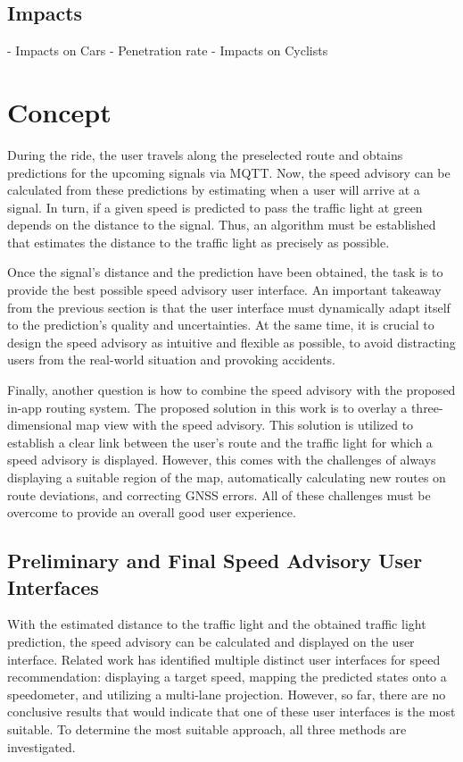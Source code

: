 \subsection{Impacts}

- Impacts on Cars
- Penetration rate
- Impacts on Cyclists

\section{Concept}

During the ride, the user travels along the preselected route and obtains predictions for the upcoming signals via MQTT. Now, the speed advisory can be calculated from these predictions by estimating when a user will arrive at a signal. In turn, if a given speed is predicted to pass the traffic light at green depends on the distance to the signal. Thus, an algorithm must be established that estimates the distance to the traffic light as precisely as possible.

Once the signal's distance and the prediction have been obtained, the task is to provide the best possible speed advisory user interface. An important takeaway from the previous section is that the user interface must dynamically adapt itself to the prediction's quality and uncertainties. At the same time, it is crucial to design the speed advisory as intuitive and flexible as possible, to avoid distracting users from the real-world situation and provoking accidents.

Finally, another question is how to combine the speed advisory with the proposed in-app routing system. The proposed solution in this work is to overlay a three-dimensional map view with the speed advisory. This solution is utilized to establish a clear link between the user's route and the traffic light for which a speed advisory is displayed. However, this comes with the challenges of always displaying a suitable region of the map, automatically calculating new routes on route deviations, and correcting GNSS errors. All of these challenges must be overcome to provide an overall good user experience.

\subsection{Preliminary and Final Speed Advisory User Interfaces}

With the estimated distance to the traffic light and the obtained traffic light prediction, the speed advisory can be calculated and displayed on the user interface. Related work has identified multiple distinct user interfaces for speed recommendation: displaying a target speed, mapping the predicted states onto a speedometer, and utilizing a multi-lane projection. However, so far, there are no conclusive results that would indicate that one of these user interfaces is the most suitable. To determine the most suitable approach, all three methods are investigated.

